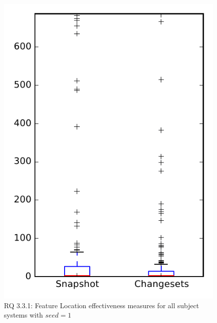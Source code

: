 
\begin{figure}
\centering
\includegraphics[height=0.4\textheight]{figures/flt_seed/rq1_overview_1}
\caption{RQ 3.3.1: Feature Location effectiveness measures for all subject systems with $seed=1$}
\label{fig:flt_seed:rq1:overview}
\end{figure}

